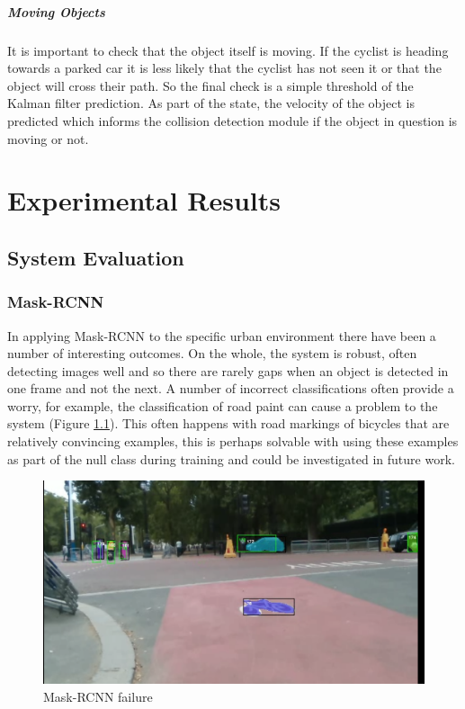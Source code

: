 \documentclass[11pt,twoside]{report}
\begin{document}
\paragraph{Moving Objects}
It is important to check that the object itself is moving. If the cyclist is heading towards a parked car it is less likely that the cyclist has not seen it or that the object will cross their path. So the final check is a simple threshold of the Kalman filter prediction. As part of the state, the velocity of the object is predicted which informs the collision detection module if the object in question is moving or not.


\chapter{Experimental Results}

\section{System Evaluation}

\subsection{Mask-RCNN}
In applying Mask-RCNN to the specific urban environment there have been a number of interesting outcomes. On the whole, the system is robust, often detecting images well and so there are rarely gaps when an object is detected in one frame and not the next. A number of incorrect classifications often provide a worry, for example, the classification of road paint can cause a problem to the system (Figure \ref{mrcnn_fail}). This often happens with road markings of bicycles that are relatively convincing examples, this is perhaps solvable with using these examples as part of the null class during training and could be investigated in future work.

\noindent \begin{figure}[h!]
	\includegraphics[width = 1.0\hsize,trim={1cm 8cm 1cm 1cm},clip]{figures/segment_bike.png}
	\caption{Mask-RCNN failure}
	\label{mrcnn_fail}
\end{figure}
\end{document}
